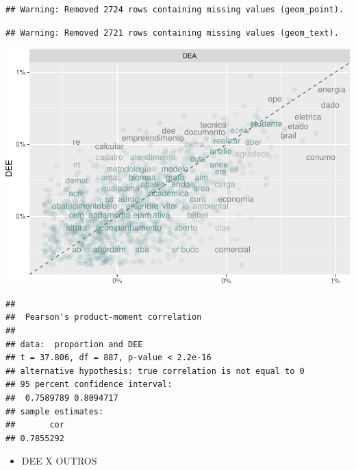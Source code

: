 \documentclass[]{article}
\newenvironment{Shaded}{\begin{snugshade}}{\end{snugshade}}
\newcommand{\KeywordTok}[1]{\textcolor[rgb]{0.13,0.29,0.53}{\textbf{#1}}}
\newcommand{\DataTypeTok}[1]{\textcolor[rgb]{0.13,0.29,0.53}{#1}}
\newcommand{\StringTok}[1]{\textcolor[rgb]{0.31,0.60,0.02}{#1}}
\newcommand{\OperatorTok}[1]{\textcolor[rgb]{0.81,0.36,0.00}{\textbf{#1}}}
\newcommand{\NormalTok}[1]{#1}
\providecommand{\tightlist}{%
  \setlength{\itemsep}{0pt}\setlength{\parskip}{0pt}}
\begin{document}
\begin{verbatim}
## Warning: Removed 2724 rows containing missing values (geom_point).
\end{verbatim}

\begin{verbatim}
## Warning: Removed 2721 rows containing missing values (geom_text).
\end{verbatim}

\includegraphics{markdown_v40_files/figure-latex/unnamed-chunk-61-1.pdf}

\begin{Shaded}
\end{Shaded}

\begin{verbatim}
## 
##  Pearson's product-moment correlation
## 
## data:  proportion and DEE
## t = 37.806, df = 887, p-value < 2.2e-16
## alternative hypothesis: true correlation is not equal to 0
## 95 percent confidence interval:
##  0.7589789 0.8094717
## sample estimates:
##       cor 
## 0.7855292
\end{verbatim}

\begin{itemize}
\tightlist
\item
  DEE X OUTROS
\end{itemize}
\end{document}
